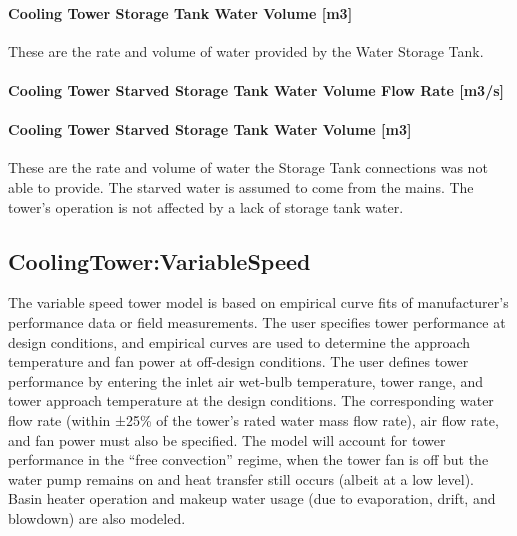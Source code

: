\paragraph{Cooling Tower Storage Tank Water Volume {[}m3{]}}\label{cooling-tower-storage-tank-water-volume-m3-2}

These are the rate and volume of water provided by the Water Storage Tank.

\paragraph{Cooling Tower Starved Storage Tank Water Volume Flow Rate {[}m3/s{]}}\label{cooling-tower-starved-storage-tank-water-volume-flow-rate-m3s-2}

\paragraph{Cooling Tower Starved Storage Tank Water Volume {[}m3{]}}\label{cooling-tower-starved-storage-tank-water-volume-m3-2}

These are the rate and volume of water the Storage Tank connections was not able to provide. The starved water is assumed to come from the mains. The tower's operation is not affected by a lack of storage tank water.

\subsection{CoolingTower:VariableSpeed}\label{coolingtowervariablespeed}

The variable speed tower model is based on empirical curve fits of manufacturer's performance data or field measurements. The user specifies tower performance at design conditions, and empirical curves are used to determine the approach temperature and fan power at off-design conditions. The user defines tower performance by entering the inlet air wet-bulb temperature, tower range, and tower approach temperature at the design conditions. The corresponding water flow rate (within ±25\% of the tower's rated water mass flow rate), air flow rate, and fan power must also be specified. The model will account for tower performance in the ``free convection'' regime, when the tower fan is off but the water pump remains on and heat transfer still occurs (albeit at a low level). Basin heater operation and makeup water usage (due to evaporation, drift, and blowdown) are also modeled.

